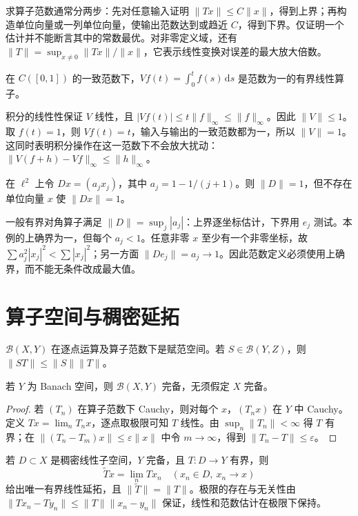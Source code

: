 \documentclass[UTF8,12pt,a4paper,fontset=fandol]{ctexbook}
\begin{document}
求算子范数通常分两步：先对任意输入证明 $\|Tx\|\leq C\|x\|$，得到上界；再构造单位向量或一列单位向量，使输出范数达到或趋近 $C$，得到下界。仅证明一个估计并不能断言其中的常数最优。对非零定义域，还有 $\|T\|=\sup_{x\ne0}\|Tx\|/\|x\|$，它表示线性变换对误差的最大放大倍数。

\begin{example}[积分算子的精确范数]\label{ex:fa-volterra-norm}
在 $C([0,1])$ 的一致范数下，$Vf(t)=\int_0^t f(s)\,\mathrm ds$ 是范数为一的有界线性算子。
\end{example}
\begin{solve}
积分的线性性保证 $V$ 线性，且 $|Vf(t)|\leq t\|f\|_\infty\leq\|f\|_\infty$。因此 $\|V\|\leq1$。取 $f(t)=1$，则 $Vf(t)=t$，输入与输出的一致范数都为一，所以 $\|V\|=1$。这同时表明积分操作在这一范数下不会放大扰动：$\|V(f+h)-Vf\|_\infty\leq\|h\|_\infty$。
\end{solve}

\begin{example}[上确界未必达到]
在 $\ell^2$ 上令 $Dx=(a_jx_j)$，其中 $a_j=1-1/(j+1)$。则 $\|D\|=1$，但不存在单位向量 $x$ 使 $\|Dx\|=1$。
\end{example}
\begin{solve}
一般有界对角算子满足 $\|D\|=\sup_j|a_j|$：上界逐坐标估计，下界用 $e_j$ 测试。本例的上确界为一，但每个 $a_j<1$。任意非零 $x$ 至少有一个非零坐标，故 $\sum a_j^2|x_j|^2<\sum|x_j|^2$；另一方面 $\|De_j\|=a_j\to1$。因此范数定义必须使用上确界，而不能无条件改成最大值。
\end{solve}

\section{算子空间与稠密延拓}
$\mathcal B(X,Y)$ 在逐点运算及算子范数下是赋范空间。若 $S\in\mathcal B(Y,Z)$，则 $\|ST\|\leq\|S\|\|T\|$。
\begin{proposition}\label{prop:fa-operator-complete}
若 $Y$ 为 Banach 空间，则 $\mathcal B(X,Y)$ 完备，无须假定 $X$ 完备。
\end{proposition}
\begin{proof}
若 $(T_n)$ 在算子范数下 Cauchy，则对每个 $x$，$(T_nx)$ 在 $Y$ 中 Cauchy。定义 $Tx=\lim_nT_nx$，逐点取极限可知 $T$ 线性。由 $\sup_n\|T_n\|<\infty$ 得 $T$ 有界；在 $\|(T_n-T_m)x\|\leq\varepsilon\|x\|$ 中令 $m\to\infty$，得到 $\|T_n-T\|\leq\varepsilon$。
\end{proof}
若 $D\subset X$ 是稠密线性子空间，$Y$ 完备，且 $T:D\to Y$ 有界，则
\[
 \widetilde T x=\lim_nTx_n\quad(x_n\in D,\ x_n\to x)
\]
给出唯一有界线性延拓，且 $\|\widetilde T\|=\|T\|$。极限的存在与无关性由 $\|Tx_n-Ty_n\|\leq\|T\|\|x_n-y_n\|$ 保证，线性和范数估计在极限下保持。
\end{document}
